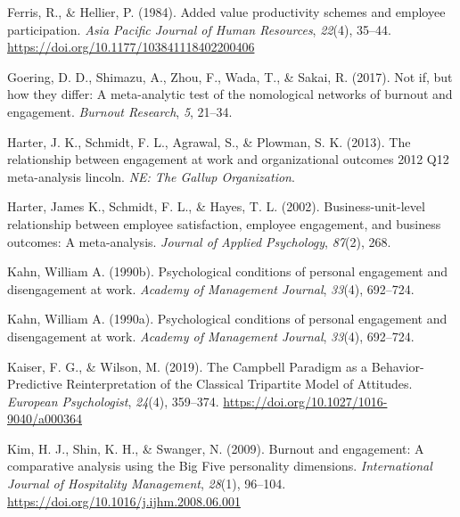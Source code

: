 \documentclass[
  man]{apa6}
\newlength{\cslhangindent}
\newlength{\cslentryspacingunit} %
\newenvironment{CSLReferences}[2] %
 {%
  \setlength{\parindent}{0pt}
  \ifodd #1
  \let\oldpar\par
  \def\par{\hangindent=\cslhangindent\oldpar}
  \fi
  \setlength{\parskip}{#2\cslentryspacingunit}
 }%
 {}
\begin{document}
\begin{CSLReferences}{1}{0}
\leavevmode{}%
Ferris, R., \& Hellier, P. (1984). Added value productivity schemes and employee participation. \emph{Asia Pacific Journal of Human Resources}, \emph{22}(4), 35--44. \url{https://doi.org/10.1177/103841118402200406}

\leavevmode{}%
Goering, D. D., Shimazu, A., Zhou, F., Wada, T., \& Sakai, R. (2017). Not if, but how they differ: A meta-analytic test of the nomological networks of burnout and engagement. \emph{Burnout Research}, \emph{5}, 21--34.

\leavevmode{}%
Harter, J. K., Schmidt, F. L., Agrawal, S., \& Plowman, S. K. (2013). The relationship between engagement at work and organizational outcomes 2012 Q12 meta-analysis lincoln. \emph{{NE}: The Gallup Organization}.

\leavevmode{}%
Harter, James K., Schmidt, F. L., \& Hayes, T. L. (2002). Business-unit-level relationship between employee satisfaction, employee engagement, and business outcomes: A meta-analysis. \emph{Journal of Applied Psychology}, \emph{87}(2), 268.

\leavevmode{}%
Kahn, William A. (1990b). Psychological conditions of personal engagement and disengagement at work. \emph{Academy of Management Journal}, \emph{33}(4), 692--724.

\leavevmode{}%
Kahn, William A. (1990a). Psychological conditions of personal engagement and disengagement at work. \emph{Academy of Management Journal}, \emph{33}(4), 692--724.

\leavevmode{}%
Kaiser, F. G., \& Wilson, M. (2019). The {Campbell} {Paradigm} as a {Behavior}-{Predictive} {Reinterpretation} of the {Classical} {Tripartite} {Model} of {Attitudes}. \emph{European Psychologist}, \emph{24}(4), 359--374. \url{https://doi.org/10.1027/1016-9040/a000364}

\leavevmode{}%
Kim, H. J., Shin, K. H., \& Swanger, N. (2009). Burnout and engagement: {A} comparative analysis using the {Big} {Five} personality dimensions. \emph{International Journal of Hospitality Management}, \emph{28}(1), 96--104. \url{https://doi.org/10.1016/j.ijhm.2008.06.001}


\end{CSLReferences}
\end{document}

